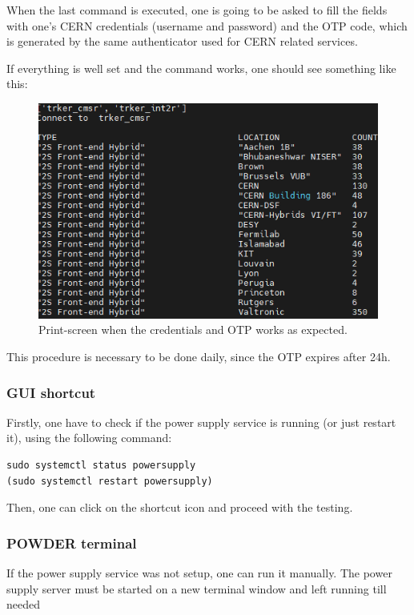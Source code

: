 \documentclass[10pt,a4paper]{article}
\begin{document}
When the last command is executed, one is going to be asked to fill the fields with one's CERN credentials (username and password) and the OTP code, which is generated by the same authenticator used for CERN related services. 

If everything is well set and the command works, one should see something like this: 

\begin{figure}[h!]
\centering
 \includegraphics[width=0.7\linewidth]{Pictures/otp-success.png} 
  \caption{Print-screen when the credentials and OTP works as expected.}
  \label{OTP}
\end{figure}

This procedure is necessary to be done daily, since the OTP expires after 24h.

\subsubsection{GUI shortcut}
\label{GUIshort}

Firstly, one have to check if the power supply service is running (or just restart it), using the following command:

\begin{framed}
\begin{verbatim}
sudo systemctl status powersupply
(sudo systemctl restart powersupply)
\end{verbatim}
\end{framed}

Then, one can click on the shortcut icon and proceed with the testing.

\subsubsection{POWDER terminal}

If the power supply service was not setup, one can run it manually. The power supply server must be started on a new terminal window and left running till needed
\end{document}
